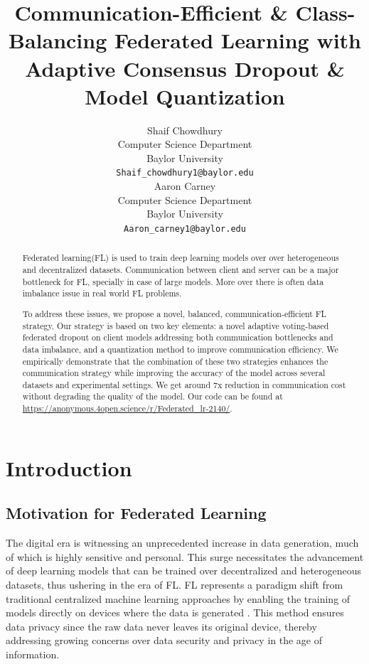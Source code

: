 \documentclass{article}
\title{Communication-Efficient \& Class-Balancing Federated Learning with Adaptive Consensus Dropout \& Model Quantization}
\author{%
  Shaif Chowdhury \\
  Computer Science Department\\
  Baylor University\\
  \texttt{Shaif_chowdhury1@baylor.edu} \\
  \And
  Aaron Carney \\
  Computer Science Department\\
  Baylor University\\
  \texttt{Aaron_carney1@baylor.edu} \\
}
\begin{document}
\maketitle


%


\begin{abstract}

Federated learning(FL) is used to train deep learning models over over heterogeneous and decentralized datasets. Communication between client and server can be a major bottleneck for FL, specially in case of large models. More over there is often data imbalance issue in real world FL problems. 

To address these issues, we propose a novel, balanced, communication-efficient FL strategy. Our strategy is based on two key elements: a novel adaptive voting-based federated dropout on client models addressing both communication bottlenecks and data imbalance, and a quantization method to improve communication efficiency. We empirically demonstrate that the combination of these two strategies enhances the communication strategy while improving the accuracy of the model across several datasets and experimental settings. We get around 7x reduction in communication cost without degrading the quality of the model. Our code can be found at \url{https://anonymous.4open.science/r/Federated_lr-2140/}.


\end{abstract}

\section{Introduction}

\subsection{Motivation for Federated Learning}

The digital era is witnessing an unprecedented increase in data generation, much of which is highly sensitive and personal. This surge necessitates the advancement of deep learning models that can be trained over decentralized and heterogeneous datasets, thus ushering in the era of FL. FL represents a paradigm shift from traditional centralized machine learning approaches by enabling the training of models directly on devices where the data is generated \cite{info13050263}. This method ensures data privacy since the raw data never leaves its original device, thereby addressing growing concerns over data security and privacy in the age of information\cite{mao2022communication, zhang2022homomorphic}.\par
\end{document}
